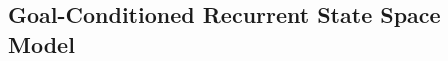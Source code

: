 \documentclass[journal]{IEEEtran}
\begin{document}





\subsection{Goal-Conditioned Recurrent State Space Model} \label{sec:gc-rssm}
\end{document}
